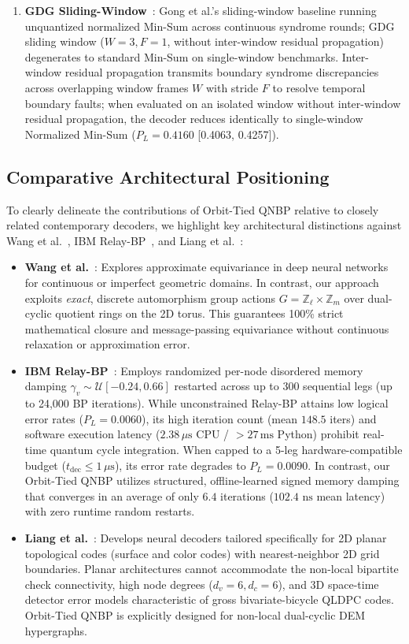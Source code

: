 \documentclass[journal]{IEEEtran}
\begin{document}
\begin{enumerate}
    \item \textbf{GDG Sliding-Window}~\cite{gong2024sliding}: Gong et al.'s sliding-window baseline running unquantized normalized Min-Sum across continuous syndrome rounds; GDG sliding window ($W=3, F=1$, without inter-window residual propagation) degenerates to standard Min-Sum on single-window benchmarks. Inter-window residual propagation transmits boundary syndrome discrepancies across overlapping window frames $W$ with stride $F$ to resolve temporal boundary faults; when evaluated on an isolated window without inter-window residual propagation, the decoder reduces identically to single-window Normalized Min-Sum ($P_L = 0.4160$ [0.4063, 0.4257]).
\end{enumerate}

\subsection{Comparative Architectural Positioning}
To clearly delineate the contributions of Orbit-Tied QNBP relative to closely related contemporary decoders, we highlight key architectural distinctions against Wang et al.~\cite{wang2022approximately}, IBM Relay-BP~\cite{muller2025relay}, and Liang et al.~\cite{liang2025planar}:
\begin{itemize}
    \item \textbf{Wang et al.}~\cite{wang2022approximately}: Explores approximate equivariance in deep neural networks for continuous or imperfect geometric domains. In contrast, our approach exploits \textit{exact}, discrete automorphism group actions $G = \mathbb{Z}_\ell \times \mathbb{Z}_m$ over dual-cyclic quotient rings on the 2D torus. This guarantees 100\% strict mathematical closure and message-passing equivariance without continuous relaxation or approximation error.
    \item \textbf{IBM Relay-BP}~\cite{muller2025relay}: Employs randomized per-node disordered memory damping $\gamma_v \sim \mathcal{U}[-0.24, 0.66]$ restarted across up to 300 sequential legs (up to 24,000 BP iterations). While unconstrained Relay-BP attains low logical error rates ($P_L = 0.0060$), its high iteration count (mean $148.5$ iters) and software execution latency ($2.38\,\mu\text{s}$ CPU / $>27\,\text{ms}$ Python) prohibit real-time quantum cycle integration. When capped to a 5-leg hardware-compatible budget ($t_{\text{dec}} \le 1\,\mu\text{s}$), its error rate degrades to $P_L = 0.0090$. In contrast, our Orbit-Tied QNBP utilizes structured, offline-learned signed memory damping that converges in an average of only $6.4$ iterations ($102.4\text{ ns}$ mean latency) with zero runtime random restarts.
    \item \textbf{Liang et al.}~\cite{liang2025planar}: Develops neural decoders tailored specifically for 2D planar topological codes (surface and color codes) with nearest-neighbor 2D grid boundaries. Planar architectures cannot accommodate the non-local bipartite check connectivity, high node degrees ($d_v=6, d_c=6$), and 3D space-time detector error models characteristic of gross bivariate-bicycle QLDPC codes. Orbit-Tied QNBP is explicitly designed for non-local dual-cyclic DEM hypergraphs.
\end{itemize}
\end{document}
